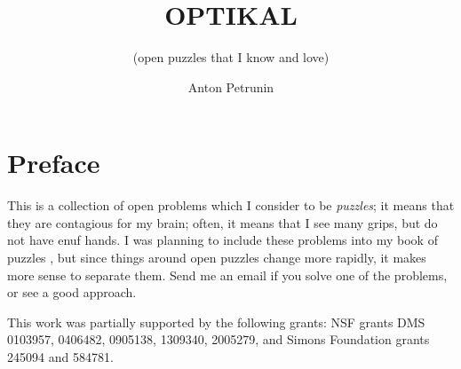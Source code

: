 \documentclass[twoside]{book}
\begin{document}
\title{OPTIKAL}
\subtitle{(open puzzles that I know and love)}
\author{Anton Petrunin}
\date{}
\maketitle



\thispagestyle{empty}
\tableofcontents
\thispagestyle{empty}

\newpage
\thispagestyle{empty}
\section*{Preface}

This is a collection of open problems which I consider to be \emph{puzzles};
it means that they are contagious for my brain;
often, it means that I see many grips, but do not have enuf hands.
I was planning to include these problems into my book of puzzles \cite{petrunin2021pigtikal},
but since things around open puzzles change more rapidly, it makes more sense to separate them.
Send me an email if you solve one of the problems, or see a good approach.


This work was partially supported by the following grants:
NSF grants DMS 
0103957,
0406482,
0905138,
1309340,
2005279,
and Simons Foundation grants 
245094 and 584781.

\null\vfill{}






\backmatter
\newpage
{}
{\scriptsize

}
\sloppy
\printbibliography[heading=bibintoc]
\fussy
\end{document}
